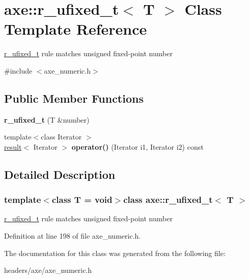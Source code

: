 \hypertarget{classaxe_1_1r__ufixed__t}{\section{axe\+:\+:r\+\_\+ufixed\+\_\+t$<$ T $>$ Class Template Reference}
\label{classaxe_1_1r__ufixed__t}
}


\hyperlink{classaxe_1_1r__ufixed__t}{r\+\_\+ufixed\+\_\+t} rule matches unsigned fixed-\/point number  




{\ttfamily \#include $<$axe\+\_\+numeric.\+h$>$}

\subsection*{Public Member Functions}
\begin{DoxyCompactItemize}
\item 
\hypertarget{classaxe_1_1r__ufixed__t_a5365c12ef441ab53d02e924e2777a8a6}{{\bfseries r\+\_\+ufixed\+\_\+t} (T \&number)}\label{classaxe_1_1r__ufixed__t_a5365c12ef441ab53d02e924e2777a8a6}

\item 
\hypertarget{classaxe_1_1r__ufixed__t_ab45298861da1e98f494d20dd8e5414c2}{{\footnotesize template$<$class Iterator $>$ }\\\hyperlink{structaxe_1_1result}{result}$<$ Iterator $>$ {\bfseries operator()} (Iterator i1, Iterator i2) const }\label{classaxe_1_1r__ufixed__t_ab45298861da1e98f494d20dd8e5414c2}

\end{DoxyCompactItemize}


\subsection{Detailed Description}
\subsubsection*{template$<$class T = void$>$class axe\+::r\+\_\+ufixed\+\_\+t$<$ T $>$}

\hyperlink{classaxe_1_1r__ufixed__t}{r\+\_\+ufixed\+\_\+t} rule matches unsigned fixed-\/point number 

Definition at line 198 of file axe\+\_\+numeric.\+h.



The documentation for this class was generated from the following file\+:\begin{DoxyCompactItemize}
\item 
headers/axe/axe\+\_\+numeric.\+h\end{DoxyCompactItemize}
